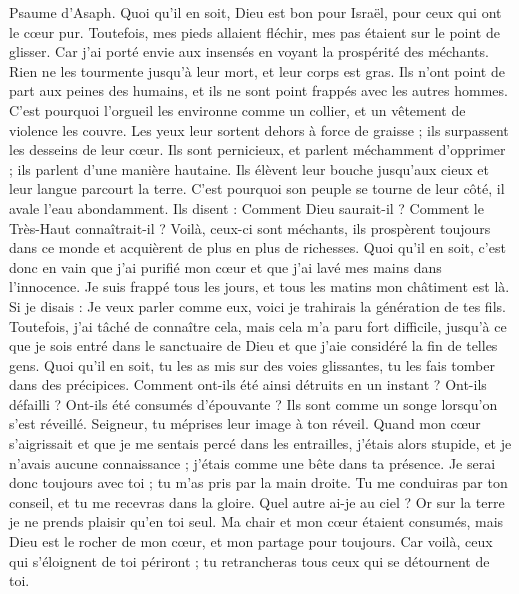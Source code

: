 \begin{multicols}{2}
\VerseOne{}Psaume d'Asaph. Quoi qu'il en soit, Dieu est bon pour Israël, pour ceux qui ont le cœur pur.
Toutefois, mes pieds allaient fléchir, mes pas étaient sur le point de glisser.
Car j'ai porté envie aux insensés en voyant la prospérité des méchants.
Rien ne les tourmente jusqu'à leur mort, et leur corps est gras.
Ils n'ont point de part aux peines des humains, et ils ne sont point frappés avec les autres hommes.
C'est pourquoi l'orgueil les environne comme un collier, et un vêtement de violence les couvre.
Les yeux leur sortent dehors à force de graisse ; ils surpassent les desseins de leur cœur.
Ils sont pernicieux, et parlent méchamment d'opprimer ; ils parlent d'une manière hautaine.
Ils élèvent leur bouche jusqu'aux cieux et leur langue parcourt la terre.
C'est pourquoi son peuple se tourne de leur côté, il avale l'eau abondamment.
Ils disent : Comment Dieu saurait-il ? Comment le Très-Haut connaîtrait-il ?
Voilà, ceux-ci sont méchants, ils prospèrent toujours dans ce monde et acquièrent de plus en plus de richesses.
Quoi qu'il en soit, c'est donc en vain que j'ai purifié mon cœur et que j'ai lavé mes mains dans l'innocence.
Je suis frappé tous les jours, et tous les matins mon châtiment est là.
Si je disais : Je veux parler comme eux, voici je trahirais la génération de tes fils.
Toutefois, j'ai tâché de connaître cela, mais cela m'a paru fort difficile,
jusqu'à ce que je sois entré dans le sanctuaire de Dieu et que j'aie considéré la fin de telles gens.
Quoi qu'il en soit, tu les as mis sur des voies glissantes, tu les fais tomber dans des précipices.
Comment ont-ils été ainsi détruits en un instant ? Ont-ils défailli ? Ont-ils été consumés d'épouvante ?
Ils sont comme un songe lorsqu'on s'est réveillé. Seigneur, tu méprises leur image à ton réveil.
Quand mon cœur s'aigrissait et que je me sentais percé dans les entrailles,
j'étais alors stupide, et je n'avais aucune connaissance ; j'étais comme une bête dans ta présence.
Je serai donc toujours avec toi ; tu m'as pris par la main droite.
Tu me conduiras par ton conseil, et tu me recevras dans la gloire.
Quel autre ai-je au ciel ? Or sur la terre je ne prends plaisir qu'en toi seul.
Ma chair et mon cœur étaient consumés, mais Dieu est le rocher de mon cœur, et mon partage pour toujours.
Car voilà, ceux qui s'éloignent de toi périront ; tu retrancheras tous ceux qui se détournent de toi.

\end{multicols}
